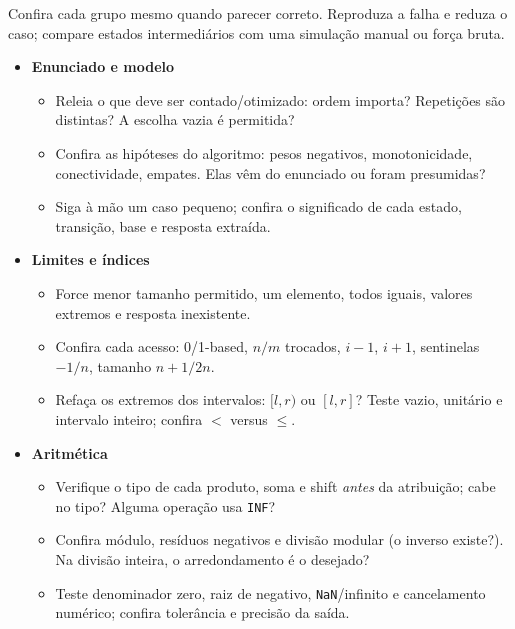 Confira cada grupo mesmo quando parecer correto. Reproduza a falha e reduza o caso; compare estados intermediários com uma simulação manual ou força bruta.
\begin{itemize}[leftmargin=*,label={}]
\item \ifextended\else\begin{minipage}[t]{\linewidth}\fi\textbf{Enunciado e modelo}
\begin{itemize}[leftmargin=*,label={\(\square\)}]
\item Releia o que deve ser contado/otimizado: ordem importa? Repetições são distintas? A escolha vazia é permitida?
\item Confira as hipóteses do algoritmo: pesos negativos, monotonicidade, conectividade, empates. Elas vêm do enunciado ou foram presumidas?
\item Siga à mão um caso pequeno; confira o significado de cada estado, transição, base e resposta extraída.
\end{itemize}
\ifextended\else\end{minipage}\fi

\item \ifextended\else\begin{minipage}[t]{\linewidth}\fi\textbf{Limites e índices}
\begin{itemize}[leftmargin=*,label={\(\square\)}]
\item Force menor tamanho permitido, um elemento, todos iguais, valores extremos e resposta inexistente.
\item Confira cada acesso: 0/1-based, $n/m$ trocados, $i-1$, $i+1$, sentinelas $-1/n$, tamanho $n+1/2n$.
\item Refaça os extremos dos intervalos: $[l,r)$ ou $[l,r]$? Teste vazio, unitário e intervalo inteiro; confira $<$ versus $\le$.
\end{itemize}
\ifextended\else\end{minipage}\fi

\item \ifextended\else\begin{minipage}[t]{\linewidth}\fi\textbf{Aritmética}
\begin{itemize}[leftmargin=*,label={\(\square\)}]
\item Verifique o tipo de cada produto, soma e shift \emph{antes} da atribuição; cabe no tipo? Alguma operação usa \texttt{INF}?
\item Confira módulo, resíduos negativos e divisão modular (o inverso existe?). Na divisão inteira, o arredondamento é o desejado?
\item Teste denominador zero, raiz de negativo, \texttt{NaN}/infinito e cancelamento numérico; confira tolerância e precisão da saída.
\end{itemize}
\ifextended\else\end{minipage}\fi


\end{itemize}
